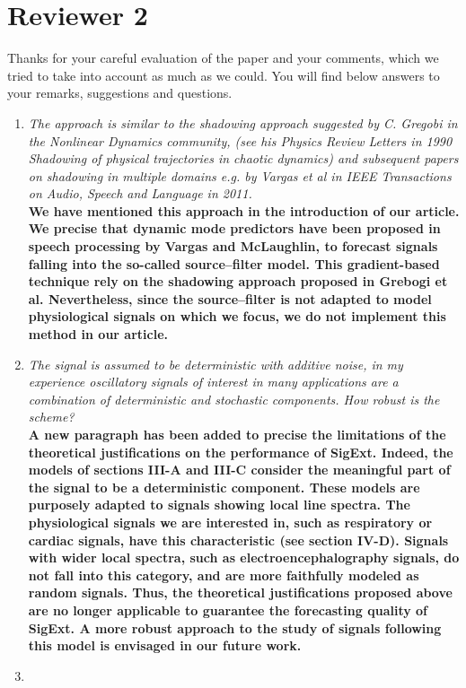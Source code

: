 \documentclass[11pt,DIV=16]{scrartcl}
\begin{document}
\section*{Reviewer 2}
Thanks for your careful evaluation of the paper and your comments, which we tried to take into account as much as we could. You will find below answers to your remarks, suggestions and questions.
\begin{enumerate}[1)]
\item
\textit{The approach is similar to the shadowing approach suggested by C. Gregobi in the Nonlinear Dynamics community, (see his Physics Review Letters in 1990 Shadowing of physical trajectories in chaotic dynamics) and subsequent papers on shadowing in multiple domains e.g. by Vargas et al in IEEE Transactions on Audio, Speech and Language in 2011.}\\
\textbf{We have mentioned this approach in the introduction of our article. We precise that dynamic mode predictors have been proposed in speech processing by Vargas and McLaughlin, to forecast signals  falling into the so-called source--filter model. This gradient-based technique rely on the shadowing approach proposed in Grebogi et al. Nevertheless,  since the source--filter is not adapted to model physiological signals on which we focus, we do not implement this method in our article.}
\item
\textit{The signal is assumed to be deterministic with additive noise, in my experience oscillatory signals of interest in many applications are a combination of deterministic and stochastic components. How robust is the scheme?}\\
\textbf{A new paragraph has been added to precise the limitations of the theoretical justifications on the performance of \textsf{SigExt}. Indeed, the models of sections III-A and III-C consider the meaningful part of the signal to be a deterministic component. These models are purposely adapted to signals showing local line spectra. The physiological signals we are interested in, such as respiratory or cardiac signals, have this characteristic (see section IV-D). Signals with wider local spectra, such as electroencephalography signals, do not fall into this category, and are more faithfully modeled as random signals. Thus, the theoretical justifications proposed above are no longer applicable to guarantee the forecasting quality of \textsf{SigExt}. A more robust approach to the study of signals following this model is envisaged in our future work.}
\item

\end{enumerate}
\end{document}
